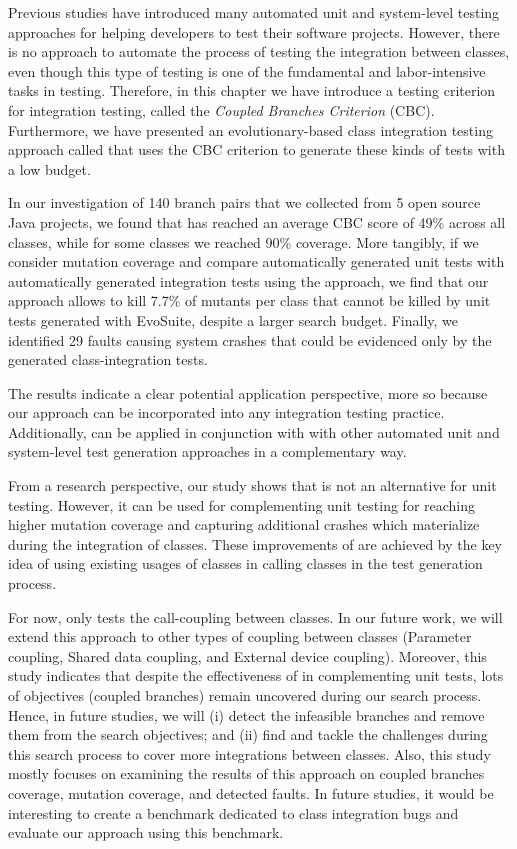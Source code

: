 Previous studies have introduced many automated unit and system-level testing approaches for helping developers to test their software projects. However, there is no approach to automate the process of testing the integration between classes, even though this type of testing is one of the fundamental and labor-intensive tasks in testing. Therefore, in this chapter we have introduce a testing criterion for integration testing, called the \textit{Coupled Branches Criterion} (CBC). Furthermore, we have presented an evolutionary-based class integration testing approach called \integration that uses the CBC criterion to generate these kinds of tests with a low budget.

In our investigation of 140 branch pairs that we collected from 5 open source Java projects, we found that \integration has reached an average CBC score of 49\% across all classes, while for some classes we reached 90\% coverage. More tangibly, if we consider mutation coverage and compare automatically generated unit tests with automatically generated integration tests using the \integration approach, we find that our approach allows to kill 7.7\% of mutants per class that cannot be killed by unit tests generated with EvoSuite, despite a larger search budget. Finally, we identified 29 faults causing system crashes that could be evidenced only by the generated class-integration tests. 

The results indicate a clear potential application perspective, more so because our approach can be incorporated into any integration testing practice. Additionally, \integration can be applied in conjunction with with other automated unit and system-level test generation approaches in a complementary way.

From a research perspective, our study shows that \integration is not an alternative for unit testing. However, it can be used for complementing unit testing for reaching higher mutation coverage and capturing additional crashes which materialize during the integration of classes. These improvements of \integration are achieved by the key idea of using existing usages of classes in calling classes in the test generation process. 

For now, \integration only tests the call-coupling between classes. In our future work, we will extend this approach to other types of coupling between classes (\eg Parameter coupling, Shared data coupling, and External device coupling). Moreover, this study indicates that despite the effectiveness of \integration in complementing unit tests, lots of objectives (coupled branches) remain uncovered during our search process. Hence, in future studies, we will (i) detect the infeasible branches and remove them from the search objectives; and (ii) find and tackle the challenges during this search process to cover more integrations between classes. Also, this study mostly focuses on examining the results of this approach on coupled branches coverage, mutation coverage, and detected faults. In future studies, it would be interesting to create a benchmark dedicated to class integration bugs and evaluate our approach using this benchmark.